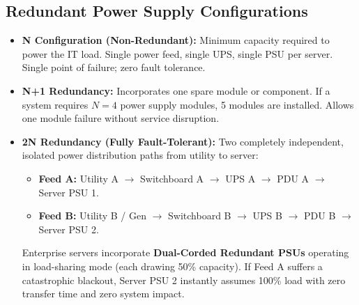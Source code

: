 \subsection{Redundant Power Supply Configurations}
\begin{itemize}[leftmargin=*]
    \item \textbf{N Configuration (Non-Redundant):} Minimum capacity required to power the IT load. Single power feed, single UPS, single PSU per server. Single point of failure; zero fault tolerance.
    \item \textbf{N+1 Redundancy:} Incorporates one spare module or component. If a system requires $N = 4$ power supply modules, 5 modules are installed. Allows one module failure without service disruption.
    \item \textbf{2N Redundancy (Fully Fault-Tolerant):} Two completely independent, isolated power distribution paths from utility to server:
    \begin{itemize}
        \item \textbf{Feed A:} Utility A $\rightarrow$ Switchboard A $\rightarrow$ UPS A $\rightarrow$ PDU A $\rightarrow$ Server PSU 1.
        \item \textbf{Feed B:} Utility B / Gen $\rightarrow$ Switchboard B $\rightarrow$ UPS B $\rightarrow$ PDU B $\rightarrow$ Server PSU 2.
    \end{itemize}
    Enterprise servers incorporate \textbf{Dual-Corded Redundant PSUs} operating in load-sharing mode (each drawing 50\% capacity). If Feed A suffers a catastrophic blackout, Server PSU 2 instantly assumes 100\% load with zero transfer time and zero system impact.
\end{itemize}
